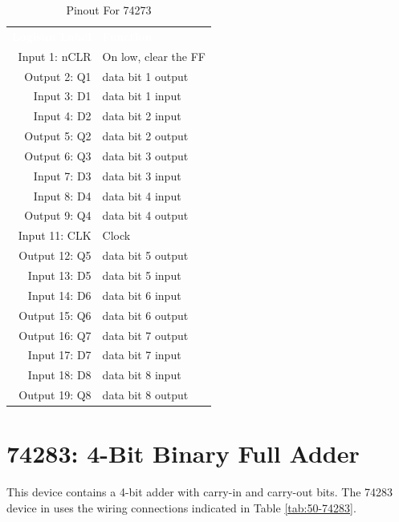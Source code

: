 \begin{table}[H]
	\sffamily
	\newcommand{\head}[1]{\textcolor{white}{\textbf{#1}}}		
	\begin{center}
		\begin{tabular}{rl} 
			\rowcolor{black!75}
			\head{Logisim Label} & \head{Function} \\
			Input 1: nCLR & On low, clear the FF \\
			Output 2: Q1  & data bit 1 output    \\
			Input 3: D1   & data bit 1 input     \\
			Input 4: D2   & data bit 2 input     \\
			Output 5: Q2  & data bit 2 output    \\
			Output 6: Q3  & data bit 3 output    \\
			Input 7: D3   & data bit 3 input     \\
			Input 8: D4   & data bit 4 input     \\
			Output 9: Q4  & data bit 4 output    \\
			Input 11: CLK & Clock                \\
			Output 12: Q5 & data bit 5 output    \\
			Input 13: D5  & data bit 5 input     \\
			Input 14: D6  & data bit 6 input     \\
			Output 15: Q6 & data bit 6 output    \\
			Output 16: Q7 & data bit 7 output    \\
			Input 17: D7  & data bit 7 input     \\
			Input 18: D8  & data bit 8 input     \\
			Output 19: Q8 & data bit 8 output    \\
		\end{tabular}
	\end{center}
	\caption{Pinout For 74273}
	\label{tab:50-74273}
\end{table}

\section{74283: 4-Bit Binary Full Adder}

This device contains a 4-bit adder with carry-in and carry-out bits. The 74283 device in \LE uses the wiring connections indicated in Table \ref{tab:50-74283}.

